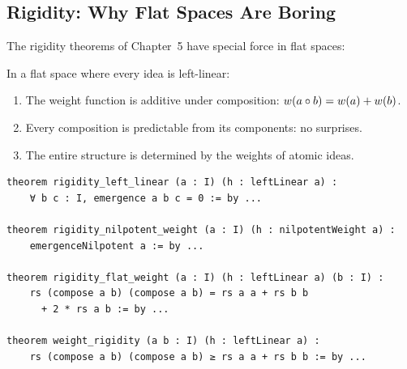\subsection{Rigidity: Why Flat Spaces Are Boring}

The rigidity theorems of Chapter~5 have special force in flat spaces:

\begin{theorem}
\label{thm:extreme-rigidity-flat}
In a flat space where every idea is left-linear:
\begin{enumerate}
  \item The weight function is additive under composition: $w(a \circ b) = w(a) + w(b)$.
  \item Every composition is predictable from its components: no surprises.
  \item The entire structure is determined by the weights of atomic ideas.
\end{enumerate}
\end{theorem}

\begin{lstlisting}[caption={Rigidity theorems (IDT\_v3\_Emergence.lean)}]
theorem rigidity_left_linear (a : I) (h : leftLinear a) :
    ∀ b c : I, emergence a b c = 0 := by ...

theorem rigidity_nilpotent_weight (a : I) (h : nilpotentWeight a) :
    emergenceNilpotent a := by ...

theorem rigidity_flat_weight (a : I) (h : leftLinear a) (b : I) :
    rs (compose a b) (compose a b) = rs a a + rs b b
      + 2 * rs a b := by ...

theorem weight_rigidity (a b : I) (h : leftLinear a) :
    rs (compose a b) (compose a b) ≥ rs a a + rs b b := by ...
\end{lstlisting}

